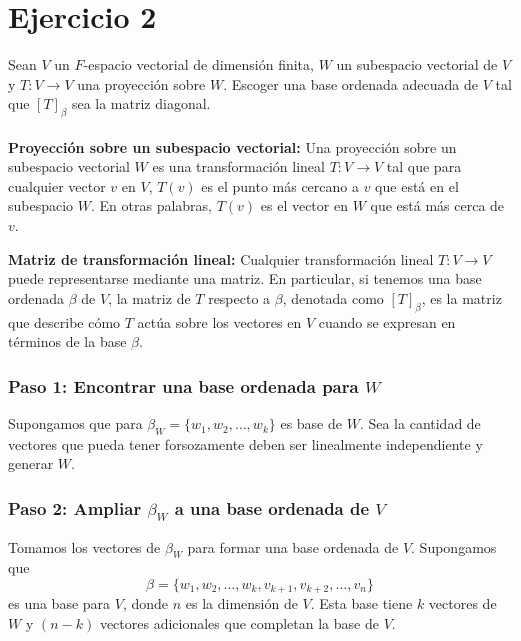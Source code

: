 \section*{Ejercicio 2}

Sean $V$ un $F$-espacio vectorial de dimensión finita, $W$ un subespacio vectorial de $V$ y $T: V \rightarrow V$
una proyección sobre $W$. Escoger una base ordenada adecuada de $V$ tal que $\left[ T \right]_{\beta}$
sea la matriz diagonal. \\

\noindent \solucion \\

\textbf{Proyección sobre un subespacio vectorial:} Una proyección sobre
un subespacio vectorial $W$ es una transformación lineal 
$T: V \rightarrow V$ tal que para cualquier vector $v$ en $V$,
$T(v)$ es el punto más cercano a $v$ que está en el subespacio $W$. 
En otras palabras, $T(v)$ es el vector en $W$ que está más cerca de $v$.

\textbf{Matriz de transformación lineal:} Cualquier transformación lineal
$T: V \rightarrow V$ puede representarse mediante una matriz.
En particular, si tenemos una base ordenada $\beta$ de $V$,
la matriz de $T$ respecto a $\beta$, denotada como $[T]_{\beta}$,
es la matriz que describe cómo $T$ actúa sobre los vectores en 
$V$ cuando se expresan en términos de la base $\beta$.

\subsubsection*{Paso 1: Encontrar una base ordenada para $W$}

Supongamos que para $\beta_W = \{w_1, w_2, \ldots, w_k\}$ es base de $W$. Sea la cantidad de vectores que pueda tener forsozamente deben ser linealmente independiente y generar $W$.

\subsubsection*{Paso 2: Ampliar $\beta_W$ a una base ordenada de $V$}

Tomamos los vectores de $\beta_W$ para formar una base ordenada de $V$. Supongamos que 
\begin{equation*}
    \beta = \{w_1, w_2, \ldots, w_k, v_{k+1}, v_{k+2}, \ldots, v_n\}
\end{equation*}
es una base para $V$, donde $n$ es la dimensión de $V$. Esta base tiene $k$ vectores de $W$ y $(n - k)$ vectores adicionales que completan la base de $V$.


